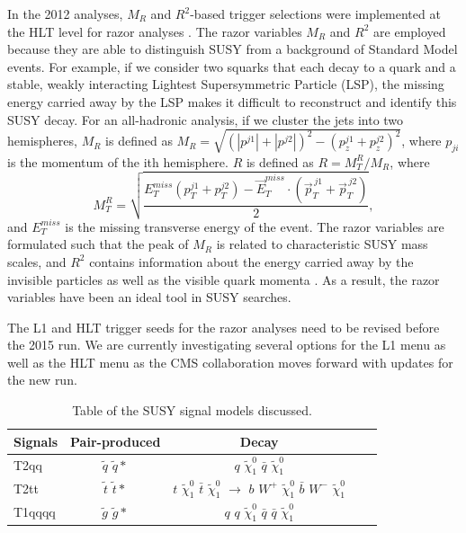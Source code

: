 \documentclass[twocolumn,aps,prd,reprint]{revtex4-1}
\begin{document}
\par In the 2012 analyses, $M_{R}$ and $R^2$-based trigger selections were implemented at the HLT level for razor analyses \cite{talk}. The razor variables $M_{R}$ and $R^2$ are employed because they are able to distinguish SUSY from a background of Standard Model events. For example, if we consider two squarks that each decay to a quark and a stable, weakly interacting Lightest Supersymmetric Particle (LSP), the missing energy carried away by the LSP makes it difficult to reconstruct and identify this SUSY decay. For an all-hadronic analysis, if we cluster the jets into two hemispheres, $M_{R}$ is defined as $M_R = \sqrt{(|p^{j1}|+|p^{j2}|)^2-(p_z^{j1}+p_z^{j2})^2}$, where $p_{ji}$ is the momentum of the ith hemisphere. $R$ is defined as $R = M^R_T/M_R$, where $$M^R_T = \sqrt{\frac{E^{miss}_T(p_T^{j1}+p_T^{j2})-\vec{E}^{miss}_T\cdot(\vec{p}_T^{\,j1}+\vec{p}_T^{\,j2})}{2}},$$ and $E_T^{miss}$ is the missing transverse energy of the event. The razor variables are formulated such that the peak of $M_R$ is related to characteristic SUSY mass scales, and $R^2$ contains information about the energy carried away by the invisible particles as well as the visible quark momenta \cite{squark}. As a result, the razor variables have been an ideal tool in SUSY searches. 
\par The L1 and HLT trigger seeds for the razor analyses need to be revised before the 2015 run. We are currently investigating several options for the L1 menu as well as the HLT menu as the CMS collaboration moves forward with updates for the new run. 
\begin{table}[h]
\renewcommand{\tabcolsep}{0.2cm}
\begin{tabular}{l*{3}{c}l}
Signals &      Pair-produced & Decay\\
\hline
T2qq & $\tilde{q}$ $\tilde{q}*$ & $q$ $\tilde{\chi}^0_1$ $\bar{q}$ $\tilde{\chi}^0_1$ \\
T2tt & $\tilde{t}$ $\tilde{t}*$  & $t$ $\tilde{\chi}^0_1$ $\bar{t}$ $\tilde{\chi}^0_1$ $\rightarrow$ $b$ $W^+$ $\tilde{\chi}^0_1$ $\bar{b}$ $W^-$ $\tilde{\chi}^0_1$\\
T1qqqq  & $\tilde{g}$ $\tilde{g}*$  & $q$ $q$ $\tilde{\chi}^0_1$ $\bar{q}$ $\bar{q}$ $\tilde{\chi}^0_1$\\
\end{tabular}
\caption[Table caption text]{Table of the SUSY signal models discussed. }
\label{table:signals}
\end{table}
\end{document}
